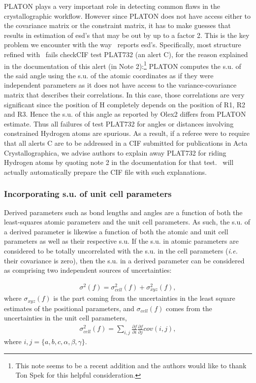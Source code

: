 \documentclass[pdf]{iucr}
\newcommand{\partialder}[2]{\frac{\partial #1}{\partial #2}}
\begin{document}
PLATON plays a very important role in detecting common flaws in the crystallographic workflow. However since PLATON does not have access either to the covariance matrix or the constraint matrix, it has to make guesses that results in estimation of esd's that may be out by up to a factor 2. This is the key problem we encounter with the way \olexrefine\ reports esd's. Specifically, most structure refined with \olexrefine\ fails checkCIF test PLAT732 (an alert C), for the reason explained in the documentation of this alert (in Note 2):\footnote{This note seems to be a recent addition and the authors would like to thank Ton Spek for this helpful consideration.} PLATON computes the s.u. of the said angle using the s.u. of the atomic coordinates as if they were independent parameters as it does not have access to the variance-covariance matrix that describes their correlations. In this case, those correlations are very significant since the position of H completely depends on the position of R1, R2 and R3. Hence the s.u. of this angle as reported by Olex2 differs from PLATON estimate. Thus all failures of test PLAT732 for angles or distances involving constrained Hydrogen atoms are spurious. As a result, if a referee were to require that all alerts C are to be addressed in a CIF submitted for publications in Acta Crystallographica, we advise authors to explain away PLAT732 for riding Hydrogen atoms by quoting note 2 in the documentation for that test. \olexrefine\ will actually automatically prepare the CIF file with such explanations.

\subsubsection{Incorporating s.u. of unit cell parameters}

Derived parameters such as bond lengths and angles are a function of both the least-squares atomic parameters and the unit cell parameters. As such, the s.u. of a derived parameter is likewise a function of both the atomic and unit cell parameters as well as their respective s.u. If the s.u. in atomic parameters are considered to be totally uncorrelated with the s.u. in the cell parameters (\emph{i.e.} their covariance is zero), then the s.u. in a derived parameter can be considered as comprising two independent sources of uncertainties:

\begin{align}
\sigma^2(f) = \sigma^2_{cell}(f) + \sigma^2_{xyz}(f)
\label{eqn:sigma_d},
\end{align}
where $\sigma_{xyz}(f)$ is the part coming from the uncertainties in the least square estimates of the positional parameters, and $\sigma_{cell}(f)$ comes from the uncertainties in the unit cell parameters,
\begin{align}
\sigma^2_{cell}(f) = \sum_{i,j}{{\partialder{f}{i}\partialder{f}{j} cov\left(i,j\right)}}
\label{eqn:sigma_cell},
\end{align}
where $i,j=\lbrace{a,b,c,\alpha,\beta,\gamma\rbrace}$.
\end{document}
